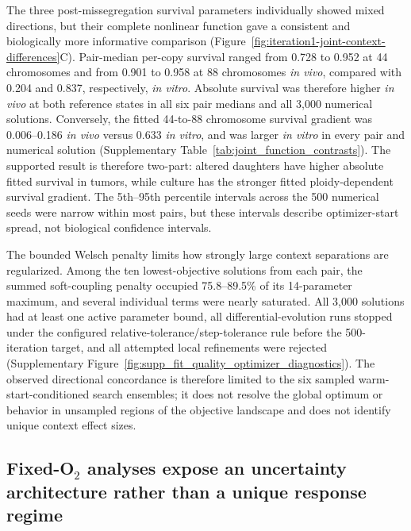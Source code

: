 \documentclass[11pt]{article}
\begin{document}
The three post-missegregation survival parameters individually showed mixed directions, but their complete nonlinear function gave a consistent and biologically more informative comparison (Figure~\ref{fig:iteration1-joint-context-differences}C). Pair-median per-copy survival ranged from 0.728 to 0.952 at 44 chromosomes and from 0.901 to 0.958 at 88 chromosomes \textit{in vivo}, compared with 0.204 and 0.837, respectively, \textit{in vitro}. Absolute survival was therefore higher \textit{in vivo} at both reference states in all six pair medians and all 3,000 numerical solutions. Conversely, the fitted 44-to-88 chromosome survival gradient was 0.006--0.186 \textit{in vivo} versus 0.633 \textit{in vitro}, and was larger \textit{in vitro} in every pair and numerical solution (Supplementary Table~\ref{tab:joint_function_contrasts}). The supported result is therefore two-part: altered daughters have higher absolute fitted survival in tumors, while culture has the stronger fitted ploidy-dependent survival gradient. The 5th--95th percentile intervals across the 500 numerical seeds were narrow within most pairs, but these intervals describe optimizer-start spread, not biological confidence intervals.

The bounded Welsch penalty limits how strongly large context separations are regularized. Among the ten lowest-objective solutions from each pair, the summed soft-coupling penalty occupied 75.8--89.5\% of its 14-parameter maximum, and several individual terms were nearly saturated. All 3,000 solutions had at least one active parameter bound, all differential-evolution runs stopped under the configured relative-tolerance/step-tolerance rule before the 500-iteration target, and all attempted local refinements were rejected (Supplementary Figure~\ref{fig:supp_fit_quality_optimizer_diagnostics}). The observed directional concordance is therefore limited to the six sampled warm-start-conditioned search ensembles; it does not resolve the global optimum or behavior in unsampled regions of the objective landscape and does not identify unique context effect sizes.

\subsection*{Fixed-O$_2$ analyses expose an uncertainty architecture rather than a unique response regime}
\end{document}
